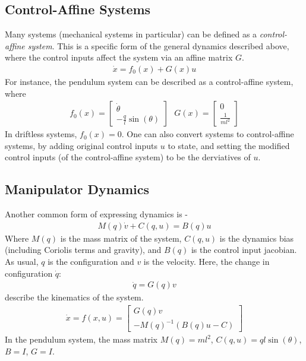 \documentclass{article}
\begin{document}
\subsection{Control-Affine Systems}
Many systems (mechanical systems in particular) can be defined as a \textit{control-affine system}. This is a specific form of the general dynamics described above, where the control inputs affect the system via an affine matrix $G$. 
\begin{align}
    \dot{x} = f_{0} (x) + G(x) u 
\end{align}
For instance, the pendulum system can be described as a control-affine system, where 
\begin{align}
    f_{0}(x) = \begin{bmatrix}
        \dot{\theta} \\
        - \frac{q}{l} \sin(\theta)
    \end{bmatrix}
    \ \ \
    G(x) = \begin{bmatrix}
        0 \\
        \frac{1}{ml^2}
    \end{bmatrix}
\end{align}
In driftless systems, $f_{0}(x)=0$. One can also convert systems to control-affine systems, by adding original control inputs $u$ to state, and setting the modified control inputs (of the control-affine system) to be the derviatives of $u$.

\subsection{Manipulator Dynamics}
Another common form of expressing dynamics is - 
\begin{align}
    M(q) \dot{v} + C(q,u) = B(q) u
\end{align}
Where $M(q)$ is the mass matrix of the system, $C(q,u)$ is the dynamics bias (including Coriolis terms and gravity), and $B(q)$ is the control input jacobian. As usual, $q$  is the configuration and $v$ is the velocity. 
Here, the change in configuration $\dot{q}$:
\begin{align}
    \dot{q} = G(q) v
\end{align}
describe the kinematics of the system.
\begin{align}
    \dot{x} = f(x,u) = \begin{bmatrix}
        G(q) v \\
        -{M(q)}^{-1} ( B(q) u - C ) 
    \end{bmatrix}
\end{align}
In the pendulum system, the mass matrix $M(q) = ml^2$, $C(q,u) = q l \sin(\theta)$, $B=I$, $G=I$.\\
\end{document}

